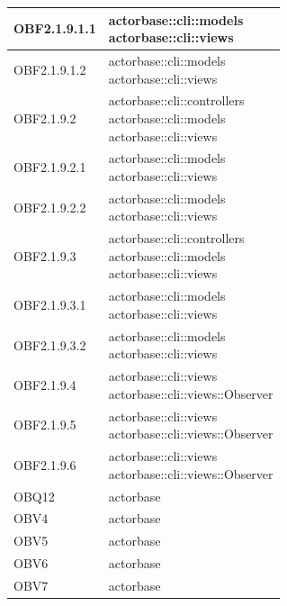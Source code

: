 \documentclass{scalatekids-article}
\begin{document}
\begin{longtable}[H]{|p{6cm}|p{11cm}|}
OBF2.1.9.1.1 & \multiLineCell[t]{actorbase::cli::models\\actorbase::cli::views\\}\\
\hline
OBF2.1.9.1.2 & \multiLineCell[t]{actorbase::cli::models\\actorbase::cli::views\\}\\
\hline
OBF2.1.9.2 & \multiLineCell[t]{actorbase::cli::controllers\\actorbase::cli::models\\actorbase::cli::views\\}\\
\hline
OBF2.1.9.2.1 & \multiLineCell[t]{actorbase::cli::models\\actorbase::cli::views\\}\\
\hline
OBF2.1.9.2.2 & \multiLineCell[t]{actorbase::cli::models\\actorbase::cli::views\\}\\
\hline
OBF2.1.9.3 & \multiLineCell[t]{actorbase::cli::controllers\\actorbase::cli::models\\actorbase::cli::views\\}\\
\hline
OBF2.1.9.3.1 & \multiLineCell[t]{actorbase::cli::models\\actorbase::cli::views\\}\\
\hline
OBF2.1.9.3.2 & \multiLineCell[t]{actorbase::cli::models\\actorbase::cli::views\\}\\
\hline
OBF2.1.9.4 & \multiLineCell[t]{actorbase::cli::views\\actorbase::cli::views::Observer\\}\\
\hline
OBF2.1.9.5 & \multiLineCell[t]{actorbase::cli::views\\actorbase::cli::views::Observer\\}\\
\hline
OBF2.1.9.6 & \multiLineCell[t]{actorbase::cli::views\\actorbase::cli::views::Observer\\}\\
\hline
OBQ12 & \multiLineCell[t]{actorbase\\}\\
\hline
OBV4 & \multiLineCell[t]{actorbase\\}\\
\hline
OBV5 & \multiLineCell[t]{actorbase\\}\\
\hline
OBV6 & \multiLineCell[t]{actorbase\\}\\
\hline
OBV7 & \multiLineCell[t]{actorbase\\}\\
\hline
\end{longtable}
\end{document}
